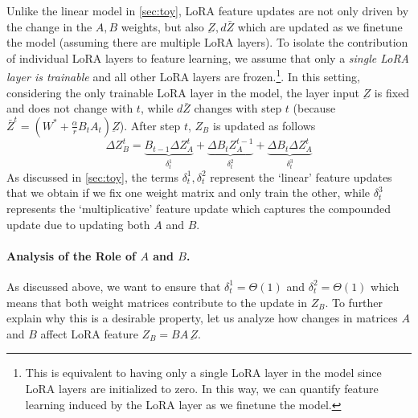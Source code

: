 Unlike the linear model in \cref{sec:toy}, LoRA feature updates are not only driven by the change in the $A, B$ weights, but also $\underbar{Z}, d\bar{Z}$ which are updated as we finetune the model (assuming there are multiple LoRA layers). To isolate the contribution of individual LoRA layers to feature learning, we assume that only a \emph{single LoRA layer is trainable} and all other LoRA layers are frozen.\footnote{This is equivalent to having only a single LoRA layer in the model since LoRA layers are initialized to zero. In this way, we can quantify feature learning induced by the LoRA layer as we finetune the model.}. In this setting, considering the only trainable LoRA layer in the model, the layer input $\underbar{Z}$ is fixed and does not change with $t$, while $d\bar{Z}$ changes with step $t$ (because $\bar{Z}^t = (W^* + \frac{\alpha}{r}B_tA_t)\underbar{Z}$). After step $t$, $Z_B$ is updated as follows 
$$
\Delta Z_B^t = \underset{\delta_t^1}{\underbrace{B_{t-1} \Delta Z_A^t }} + \underset{\delta_t^2}{\underbrace{\Delta B_t Z_A^{t-1}}} + \underset{\delta^3_t}{\underbrace{\Delta B_t \Delta Z_A^t}}
$$
As discussed in \cref{sec:toy}, the terms $\delta^1_t, \delta^2_t$ represent the `linear' feature updates that we obtain if we fix one weight matrix and only train the other, while $\delta^3_t$ represents the `multiplicative' feature update which captures the compounded update due to updating both $A$ and $B$. 

\paragraph{Analysis of the Role of $A$ and $B$.} As discussed above,  we want to ensure that $\delta_t^1 = \Theta(1)$ and $\delta_t^2 = \Theta(1)$ which means that both weight matrices contribute to the update in $Z_B$. To further explain why this is a desirable property, let us analyze how changes in matrices $A$ and $B$ affect LoRA feature $Z_B = BA \,\underbar{Z}$. 

